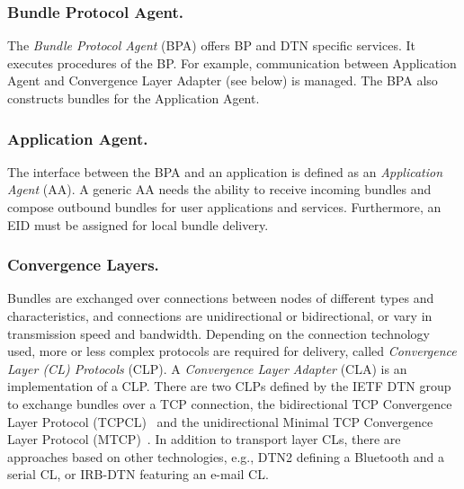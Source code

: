 \subsubsection{Bundle Protocol Agent.}
The \textit{Bundle Protocol Agent} (BPA) offers BP and DTN specific services.
It executes procedures of the BP.
For example, communication between Application Agent and Convergence Layer Adapter (see below) is managed.
The BPA also constructs bundles for the Application Agent.

\subsubsection{Application Agent.}
The interface between the BPA and an application is defined as an \textit{Application Agent} (AA).
A generic AA needs the ability to receive incoming bundles and compose outbound bundles for user applications and services.
Furthermore, an EID must be assigned for local bundle delivery.

\subsubsection{Convergence Layers.}
Bundles are exchanged over connections between nodes of different types and characteristics, and connections are unidirectional or bidirectional, or vary in transmission speed and bandwidth.
Depending on the connection technology used, more or less complex protocols are required for delivery, called \textit{Convergence Layer (CL) Protocols} (CLP).
A \textit{Convergence Layer Adapter} (CLA) is an implementation of a CLP.
There are two CLPs defined by the IETF DTN group to exchange bundles over a TCP connection, the bidirectional TCP Convergence Layer Protocol (TCPCL)~\cite{dtn_tcp} and the unidirectional Minimal TCP Convergence Layer Protocol (MTCP)~\cite{dtn_mtcp}.
In addition to transport layer CLs, there are approaches based on other technologies, e.g., DTN2 defining a Bluetooth and a serial CL, or IRB-DTN featuring an e-mail CL.
